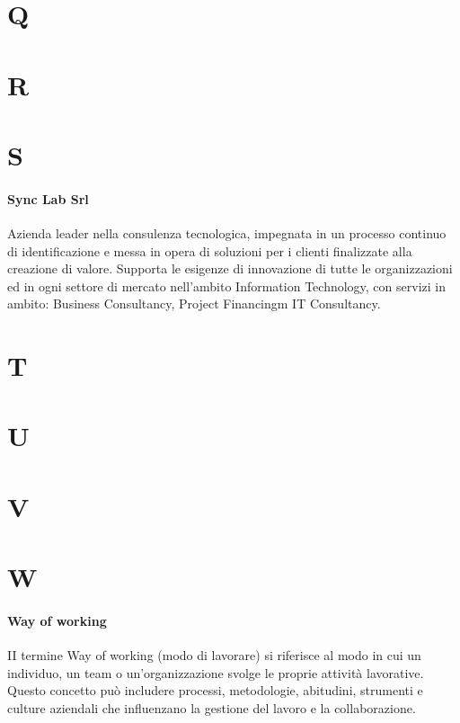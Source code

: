 \documentclass[italian,12pt]{article} %
\newcommand{\glossdef}[2]{\paragraph{#1}#2}
\begin{document}
\newpage

\section{Q}



\newpage

\section{R}



\newpage

\section{S}
\glossdef{Sync Lab Srl}{
	Azienda leader nella consulenza tecnologica, impegnata in un processo continuo di identificazione e messa in opera di soluzioni per i clienti finalizzate alla creazione di valore. Supporta le esigenze di innovazione di tutte le organizzazioni ed in ogni settore di mercato nell'ambito Information Technology, con servizi in ambito: Business Consultancy, Project Financingm IT Consultancy.
} %


\newpage

\section{T}



\newpage

\section{U}



\newpage

\section{V}



\newpage

\section{W}
\glossdef{Way of working}{
	II termine Way of working (modo di lavorare) si riferisce al modo in cui un individuo, un team o un'organizzazione svolge le proprie attività lavorative. Questo concetto può includere processi, metodologie, abitudini, strumenti e culture aziendali che influenzano la gestione del lavoro e la collaborazione.
}
\end{document}
